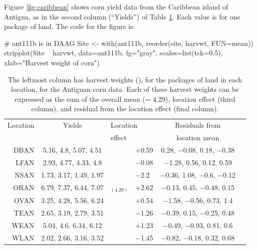 Figure \ref{fig:caribbean} shows corn yield data from the Caribbean island of
Antigua, as in the second column (``Yields'') of Table \ref{tab:ant111b}.
Each value is for one package of land.
The code for the figure is:
\begin{Schunk}
\begin{Sinput}
# ant111b is in DAAG
Site <- with(ant111b, reorder(site, harvwt,
                              FUN=mean))
stripplot(Site ~ harvwt, data=ant111b, fg="gray",
          scales=list(tck=0.5),
          xlab="Harvest weight of corn")
\end{Sinput}
\end{Schunk}

\begin{table}
\begin{center}
{\small
\begin{tabular}{@{}rc||r@{\hspace{1mm}}lcc@{}}
\hline
\multicolumn{1}{c}{Location}  & \multicolumn{1}{c}{Yields}  &
\multicolumn{2}{l}{Location} & Residuals from\\
 & & \multicolumn{2}{l}{effect} & \multicolumn{1}{c}{location mean}\\
\hline
DBAN &  5.16, 4.8, 5.07, 4.51 &  \vline& $+$0.59 & 0.28, $-$0.08, 0.18, $-$0.38 \\
LFAN &  2.93, 4.77, 4.33, 4.8 &  \vline& $-$0.08 &  $-$1.28, 0.56, 0.12, 0.59 \\
NSAN & 1.73, 3.17, 1.49, 1.97 &  \vline& $-$2.2 & $-$0.36, 1.08, $-$0.6, $-$0.12 \\
ORAN & 6.79, 7.37, 6.44, 7.07 & $_{(4.29)} $ \vline& $+$2.62 & $-$0.13, 0.45, $-$0.48, 0.15 \\
OVAN & 3.25, 4.28, 5.56, 6.24 &  \vline& $+$0.54 &  $-$1.58, $-$0.56, 0.73, 1.4 \\
TEAN & 2.65, 3.19, 2.79, 3.51 &  \vline& $-$1.26 & $-$0.39, 0.15, $-$0.25, 0.48 \\
WEAN &  5.04, 4.6, 6.34, 6.12 &  \vline& $+$1.23 &  $-$0.49, $-$0.93, 0.81, 0.6 \\
WLAN & 2.02, 2.66, 3.16, 3.52 &  \vline& $-$1.45 & $-$0.82, $-$0.18, 0.32, 0.68 \\
\hline
\end{tabular}
}
\caption{The leftmost column has harvest weights (), for
  the packages of land in each location, for the Antiguan corn data.  Each of
  these harvest weights can be expressed as the sum of the overall
  mean (= 4.29), location effect (third column), and residual from the
  location effect (final column).
\label{tab:ant111b}}
\end{center}
\vspace*{-0pt}
\end{table}
\vspace*{3pt}

